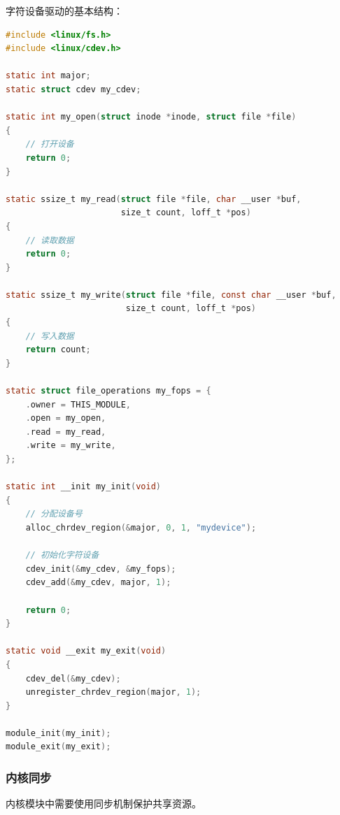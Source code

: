 字符设备驱动的基本结构：
\begin{lstlisting}[language=C]
#include <linux/fs.h>
#include <linux/cdev.h>

static int major;
static struct cdev my_cdev;

static int my_open(struct inode *inode, struct file *file)
{
    // 打开设备
    return 0;
}

static ssize_t my_read(struct file *file, char __user *buf,
                       size_t count, loff_t *pos)
{
    // 读取数据
    return 0;
}

static ssize_t my_write(struct file *file, const char __user *buf,
                        size_t count, loff_t *pos)
{
    // 写入数据
    return count;
}

static struct file_operations my_fops = {
    .owner = THIS_MODULE,
    .open = my_open,
    .read = my_read,
    .write = my_write,
};

static int __init my_init(void)
{
    // 分配设备号
    alloc_chrdev_region(&major, 0, 1, "mydevice");

    // 初始化字符设备
    cdev_init(&my_cdev, &my_fops);
    cdev_add(&my_cdev, major, 1);

    return 0;
}

static void __exit my_exit(void)
{
    cdev_del(&my_cdev);
    unregister_chrdev_region(major, 1);
}

module_init(my_init);
module_exit(my_exit);
\end{lstlisting}

\subsubsection{内核同步}

内核模块中需要使用同步机制保护共享资源。

